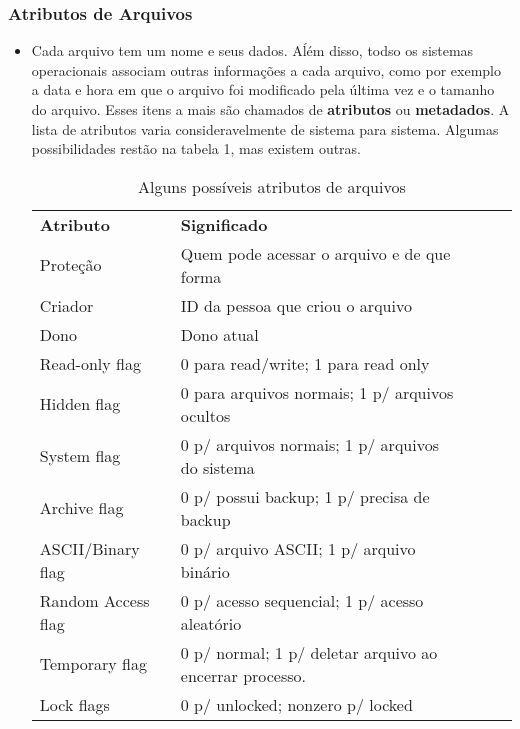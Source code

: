 \documentclass[10pt]{article}
\begin{document}
\subsubsection{Atributos de Arquivos}
\begin{itemize}
    \item Cada arquivo tem um nome e seus dados. Aĺém disso, todso os sistemas operacionais associam outras informações a cada
    arquivo, como por exemplo a data e hora em que o arquivo foi modificado pela última vez e o tamanho do arquivo. Esses
    itens a mais são chamados de \textbf{atributos} ou \textbf{metadados}. A lista de atributos varia consideravelmente
    de sistema para sistema. Algumas possibilidades restão na tabela 1, mas existem outras.
    \begin{table}[!ht]
        \centering
        \caption{Alguns possíveis atributos de arquivos}
        \label{atributos}
        \begin{tabular}{lllll}
        \textbf{Atributo}       & \textbf{Significado}                                     &  &  &  \\
        Proteção                & Quem pode acessar o arquivo e de que forma               &  &  &  \\
        Criador                 & ID da pessoa que criou o arquivo                         &  &  &  \\
        Dono                    & Dono atual                                               &  &  &  \\
        Read-only flag          & 0 para read/write; 1 para read only                      &  &  &  \\
        Hidden flag             & 0 para arquivos normais; 1 p/ arquivos ocultos           &  &  &  \\
        System flag             & 0 p/ arquivos normais; 1 p/ arquivos do sistema          &  &  &  \\
        Archive flag            & 0 p/ possui backup; 1 p/ precisa de backup               &  &  &  \\
        ASCII/Binary flag       & 0 p/ arquivo ASCII; 1 p/ arquivo binário                 &  &  &  \\
        Random Access flag      & 0 p/ acesso sequencial; 1 p/ acesso aleatório            &  &  &  \\
        Temporary flag          & 0 p/ normal; 1 p/ deletar arquivo ao encerrar processo.  &  &  &  \\
        Lock flags              & 0 p/ unlocked; nonzero p/ locked                         &  &  &  \\

\end{tabular}
\end{table}
\end{itemize}
\end{document}
